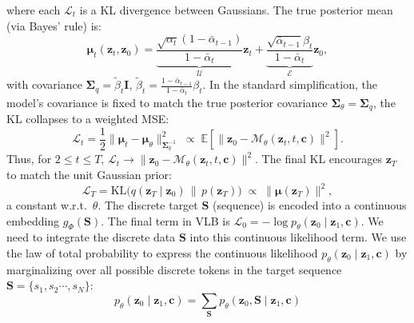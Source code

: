 \noindent where each $\mathcal{L}_t$ is a KL divergence between Gaussians.  
The true posterior mean (via Bayes' rule) is:
\begin{equation}
    \boldsymbol{\mu}_t(\mathbf{z}_t,\mathbf{z}_0)
    =
    \underbrace{
        \frac{\sqrt{\alpha_t}(1-\bar{\alpha}_{t-1})}
             {1-\bar{\alpha}_t}
    }_{\mathcal{U}}
    \mathbf{z}_t
    +
    \underbrace{
        \frac{\sqrt{\bar{\alpha}_{t-1}}\beta_t}
             {1-\bar{\alpha}_t}
    }_{\mathcal{E}}
    \mathbf{z}_0,
\end{equation}
with covariance $\boldsymbol{\Sigma}_q = \tilde{\beta}_t \mathbf{I}$, $\tilde{\beta}_t =
    \frac{1-\bar{\alpha}_{t-1}}{1-\bar{\alpha}_t}\beta_t.$
In the standard simplification, the model's covariance is fixed to match the true posterior covariance $\boldsymbol{\Sigma}_\theta = \boldsymbol{\Sigma}_q$,  
the KL collapses to a weighted MSE:
\begin{equation}
    \mathcal{L}_t
    = \frac{1}{2}
        \bigl\|
            \boldsymbol{\mu}_t
            - \boldsymbol{\mu}_\theta
        \bigr\|_{\boldsymbol{\Sigma}_q^{-1}}^2
    \;\propto\;
    \mathbb{E}\!
    \left[
        \bigl\|
            \mathbf{z}_0
            - \mathcal{M}_\theta(\mathbf{z}_t,t,\mathbf{c})
        \bigr\|^2
    \right].
\end{equation}
Thus, for $2\le t\le T$, $ \mathcal{L}_t
    \rightarrow
    \|\mathbf{z}_0
    - \mathcal{M}_\theta(\mathbf{z}_t,t,\mathbf{c})\|^2.$
The final KL encourages $\mathbf{z}_T$ to match the unit Gaussian prior:
\begin{equation}
    \mathcal{L}_T
    = \mathrm{KL}\bigl(q(\mathbf{z}_T\mid\mathbf{z}_0)\,\|\,p(\mathbf{z}_T)\bigr)
    \;\propto\;
    \bigl\|\boldsymbol{\mu}(\mathbf{z}_T)\bigr\|^2,
\end{equation}
a constant w.r.t.\ $\theta$.
The discrete target $\mathbf{S}$ (sequence) is encoded into a continuous embedding $g_\Phi(\mathbf{S})$.  
The final term in VLB is $\mathcal{L}_0 = -\log p_\theta(\mathbf{z}_0\mid\mathbf{z}_1, \mathbf{c})$. We need to integrate the discrete data $\mathbf{S}$ into this continuous likelihood term.
We use the law of total probability to express the continuous likelihood $p_\theta(\mathbf{z}_0\mid\mathbf{z}_1, \mathbf{c})$ by marginalizing over all possible discrete tokens in the target sequence $\mathbf{S} = \{s_1, s_2 \cdots, s_N\}$: 
\begin{equation}
    p_\theta(\mathbf{z}_0 \mid \mathbf{z}_1, \mathbf{c}) = \sum_{\mathbf{S}} p_\theta(\mathbf{z}_0, \mathbf{S} \mid \mathbf{z}_1, \mathbf{c})
\end{equation}
